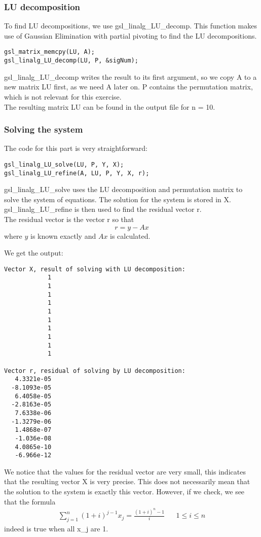 \documentclass[11pt, a4paper, titlepage, openright]{article}
\begin{document}
    \subsubsection{LU decomposition}
    To find LU decompositions, we use gsl\_linalg\_LU\_decomp. This function makes use of Gaussian Elimination with partial pivoting to find the LU decompositions.
\begin{lstlisting}
gsl_matrix_memcpy(LU, A);
gsl_linalg_LU_decomp(LU, P, &sigNum);
\end{lstlisting}
    gsl\_linalg\_LU\_decomp writes the result to its first argument, so we copy A to a new matrix
    LU first, as we need A later on. P contains the permutation matrix, which is not relevant for
    this exercise. \\ The resulting matrix LU can be found in the output file for n = 10.

    \subsubsection{Solving the system}
    The code for this part is very straightforward:
\begin{lstlisting}
gsl_linalg_LU_solve(LU, P, Y, X);
gsl_linalg_LU_refine(A, LU, P, Y, X, r);
\end{lstlisting}
    gsl\_linalg\_LU\_solve uses the LU decomposition and permutation matrix to solve the system of equations.
    The solution for the system is stored in X. gsl\_linalg\_LU\_refine is then used to find the residual vector r.\\
    The residual vector is the vector r so that \[ r = y - Ax \] where \(y\) is known exactly and \(Ax\) is calculated. 
    
    We get the output:
\begin{lstlisting}
Vector X, result of solving with LU decomposition:
            1
            1
            1
            1
            1
            1
            1
            1
            1
            1

Vector r, residual of solving by LU decomposition:
   4.3321e-05
  -8.1093e-05
   6.4058e-05
  -2.8163e-05
   7.6338e-06
  -1.3279e-06
   1.4868e-07
   -1.036e-08
   4.0865e-10
   -6.966e-12
\end{lstlisting}
    We notice that the values for the residual vector are very small, this indicates that the resulting
    vector X is very precise. This does not necessarily mean that the solution to the system is exactly this vector.
    However, if we check, we see that the formula
    \[
        \begin{aligned}
            \sum_{j=1}^{n} (1+i)^{j-1} x_j = \frac{(1+i)^{n} - 1}{i}     && 1 \le i \le n
        \end{aligned}
    \]
    indeed is true when all x\_j are 1.
\end{document}
